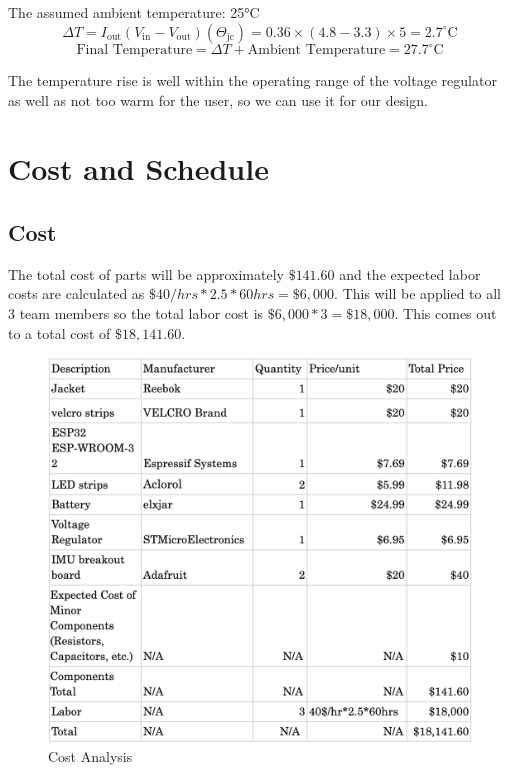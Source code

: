 \documentclass[12pt]{article}
\begin{document}
\noindent The assumed ambient temperature: 25°C 
\[
\Delta T = I_{\text{out}} (V_{\text{in}} - V_{\text{out}}) (\Theta_{\text{jc}}) = 0.36 \times (4.8 - 3.3) \times 5 = 2.7^\circ\text{C}
\]
\[
\text{Final Temperature} = \Delta T + \text{Ambient Temperature} = 27.7^\circ\text{C}
\]

\noindent The temperature rise is well within the operating range of the voltage regulator as well as not too warm for the user, so we can use it for our design.

\newpage
\section{Cost and Schedule}

\subsection{Cost}
The total cost of parts will be approximately $\$141.60$ and the expected labor costs are calculated as $\$40/hrs * 2.5 * 60 hrs = \$6,000$. This will be applied to all 3 team members so the total labor cost is $\$6,000 * 3 = \$18,000$. This comes out to a total cost of $\$18,141.60$.
\begin{figure}[ht]
    \centering
    \includegraphics[width=1\textwidth]{cost_analysis.png}
    \caption{Cost Analysis}
    \label{fig:my_label2}
\end{figure}
\end{document}

